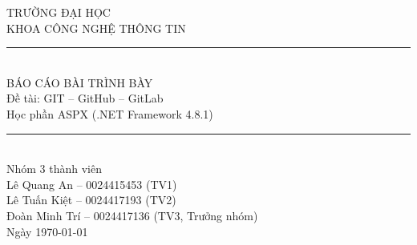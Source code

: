 \documentclass[12pt,a4paper]{article}
\begin{document}
\begin{titlepage}
\centering
\vspace*{1.5cm}
{\Large TRƯỜNG ĐẠI HỌC}\\[0.3cm]
{\Large KHOA CÔNG NGHỆ THÔNG TIN}\\[0.8cm]
\rule{\textwidth}{1pt}\\[0.8cm]
{\Large BÁO CÁO BÀI TRÌNH BÀY}\\[0.5cm]
{\Large Đề tài: GIT -- GitHub -- GitLab}\\[0.5cm]
{\Large Học phần ASPX (.NET Framework 4.8.1)}\\[0.8cm]
\rule{\textwidth}{1pt}\\[1.0cm]
{\Large Nhóm 3 thành viên}\\[0.6cm]
{\large Lê Quang An -- 0024415453 (TV1)}\\[0.2cm]
{\large Lê Tuấn Kiệt -- 0024417193 (TV2)}\\[0.2cm]
{\large Đoàn Minh Trí -- 0024417136 (TV3, Trưởng nhóm)}\\[0.6cm]
\vfill
{\large Ngày \today}\\[1.0cm]
\end{titlepage}
\tableofcontents
\newpage










\end{document}

